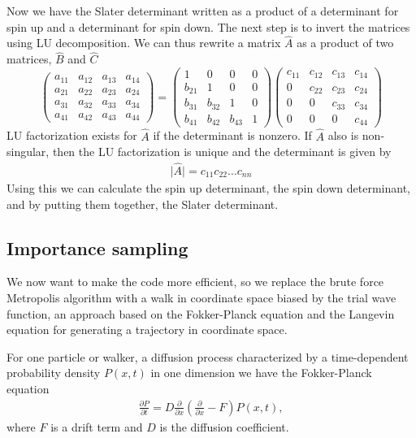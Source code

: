 \documentclass[11pt]{article}
\begin{document}
			Now we have the Slater determinant written as a product of a determinant
			for spin up and a determinant for spin down. The next step is to invert
			the matrices using LU decomposition. We can thus rewrite a matrix
			$\hat{A}$ as a product of two matrices, $\hat{B}$ and $\hat{C}$
			\[
			\left(\begin{array}{cccc}
			a_{11} & a_{12} & a_{13} & a_{14}\\
			a_{21} & a_{22} & a_{23} & a_{24}\\
			a_{31} & a_{32} & a_{33} & a_{34}\\
			a_{41} & a_{42} & a_{43} & a_{44}
			\end{array}\right)=\left(\begin{array}{cccc}
			1 & 0 & 0 & 0\\
			b_{21} & 1 & 0 & 0\\
			b_{31} & b_{32} & 1 & 0\\
			b_{41} & b_{42} & b_{43} & 1
			\end{array}\right)\left(\begin{array}{cccc}
			c_{11} & c_{12} & c_{13} & c_{14}\\
			0 & c_{22} & c_{23} & c_{24}\\
			0 & 0 & c_{33} & c_{34}\\
			0 & 0 & 0 & c_{44}
			\end{array}\right)
			\]
			LU factorization exists for $\hat{A}$ if the determinant is nonzero.
			If $\hat{A}$ also is non-singular, then the LU factorization is unique
			and the determinant is given by
			\begin{align}
				\vert\hat{A}\vert=c_{11}c_{22}\dots c_{nn}
			\end{align}
			Using this we can calculate the spin up determinant, the spin down
			determinant, and by putting them together, the Slater determinant.

	\subsection{Importance sampling}
		We now want to make the code more efficient, so we replace the brute
		force Metropolis algorithm with a walk in coordinate space biased
		by the trial wave function, an approach based on the Fokker-Planck
		equation and the Langevin equation for generating a trajectory in
		coordinate space.

		For one particle or walker, a diffusion process characterized by a
		time-dependent probability density $P\left(x,t\right)$ in one dimension
		we have the Fokker-Planck equation
		\begin{align}
			\frac{\partial P}{\partial t}=D\frac{\partial}{\partial x}\left(\frac{\partial}{\partial x}-F\right)P\left(x,t\right),
		\end{align}
		where $F$ is a drift term and $D$ is the diffusion coefficient.
\end{document}
